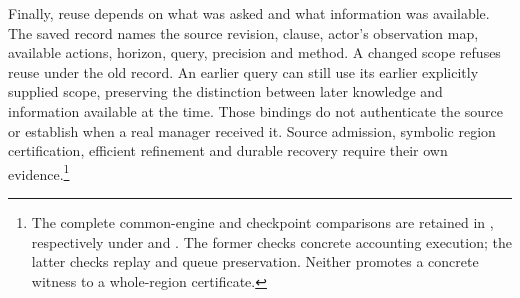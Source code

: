Finally, reuse depends on what was asked and what information was available. The saved record names the source revision, clause, actor's observation map, available actions, horizon, query, precision and method. A changed scope refuses reuse under the old record. An earlier query can still use its earlier explicitly supplied scope, preserving the distinction between later knowledge and information available at the time. Those bindings do not authenticate the source or establish when a real manager received it. Source admission, symbolic region certification, efficient refinement and durable recovery require their own evidence.\footnote{The complete common-engine and checkpoint comparisons are retained in , respectively under  and . The former checks concrete accounting execution; the latter checks replay and queue preservation. Neither promotes a concrete witness to a whole-region certificate.}
